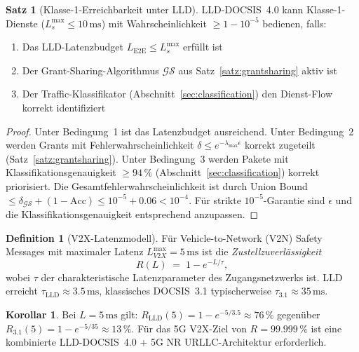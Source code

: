 ﻿\documentclass[a4paper,12pt]{article}
\theoremstyle{definition}
\newtheorem{definition}{Definition}
\newtheorem{satz}{Satz}
\newtheorem{korollar}{Korollar}
\begin{document}
\begin{satz}[Klasse-1-Erreichbarkeit unter LLD]
    \label{satz:klasse1}
    LLD-DOCSIS~4.0 kann Klasse-1-Dienste ($L_s^{\max} \leq 10\,\mathrm{ms}$)
    mit Wahrscheinlichkeit $\geq 1 - 10^{-5}$ bedienen, falls:
    \begin{enumerate}
        \item Das LLD-Latenzbudget $L_{\mathrm{E2E}} \leq L_s^{\max}$ erf\"{u}llt ist
        \item Der Grant-Sharing-Algorithmus $\mathcal{GS}$ aus Satz~\ref{satz:grantsharing}
              aktiv ist
        \item Der Traffic-Klassifikator (Abschnitt~\ref{sec:classification})
              den Dienst-Flow korrekt identifiziert
    \end{enumerate}
\end{satz}

\begin{proof}
    Unter Bedingung~1 ist das Latenzbudget ausreichend. Unter Bedingung~2
    werden Grants mit Fehlerwahrscheinlichkeit $\delta \leq e^{-\lambda_{\max}\epsilon}$
    korrekt zugeteilt (Satz~\ref{satz:grantsharing}). Unter Bedingung~3
    werden Pakete mit Klassifikationsgenauigkeit $\geq 94\,\%$ (Abschnitt~\ref{sec:classification})
    korrekt priorisiert. Die Gesamtfehlerwahrscheinlichkeit ist durch Union Bound
    $\leq \delta_{\mathcal{GS}} + (1 - \text{Acc}) \leq 10^{-5} + 0.06 < 10^{-4}$.
    F\"{u}r strikte $10^{-5}$-Garantie sind $\epsilon$ und die Klassifikationsgenauigkeit
    entsprechend anzupassen.
\end{proof}

\begin{definition}[V2X-Latenzmodell]
    F\"{u}r Vehicle-to-Network (V2N) Safety Messages mit maximaler Latenz
    $L_{V2X}^{\max} = 5\,\mathrm{ms}$ ist die \emph{Zustellzuverl\"{a}ssigkeit}
    \[
        R(L) \;=\; 1 - e^{-L/\tau},
    \]
    wobei $\tau$ der charakteristische Latenzparameter des Zugangsnetzwerks ist.
    LLD erreicht $\tau_{\mathrm{LLD}} \approx 3.5\,\mathrm{ms}$, klassisches
    DOCSIS~3.1 typischerweise $\tau_{3.1} \approx 35\,\mathrm{ms}$.
\end{definition}

\begin{korollar}
    Bei $L = 5\,\mathrm{ms}$ gilt:
    $R_{\mathrm{LLD}}(5) = 1 - e^{-5/3.5} \approx 76\,\%$
    gegen\"{u}ber $R_{3.1}(5) = 1 - e^{-5/35} \approx 13\,\%$.
    F\"{u}r das 5G V2X-Ziel von $R = 99.999\,\%$ ist eine kombinierte
    LLD-DOCSIS~4.0 + 5G NR URLLC-Architektur erforderlich.
\end{korollar}
\end{document}
